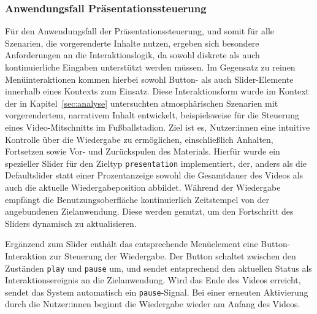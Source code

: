 \subsubsection{Anwendungsfall Präsentationssteuerung}
Für den Anwendungsfall der Präsentationssteuerung, und somit für alle Szenarien, die vorgerenderte Inhalte nutzen, ergeben sich besondere Anforderungen an die Interaktionslogik, da sowohl diskrete als auch kontinuierliche Eingaben unterstützt werden müssen.
Im Gegensatz zu reinen Menüinteraktionen kommen hierbei sowohl Button- als auch Slider-Elemente innerhalb eines Kontexts zum Einsatz.
Diese Interaktionsform wurde im Kontext der in Kapitel~\ref{sec:analyse} untersuchten atmosphärischen Szenarien mit vorgerendertem, narrativem Inhalt entwickelt, beispielsweise für die Steuerung eines Video-Mitschnitts im Fußballstadion. 
Ziel ist es, Nutzer:innen eine intuitive Kontrolle über die Wiedergabe zu ermög\-lichen, einschließlich Anhalten, Fortsetzen sowie Vor- und Zurückspulen des Materials.
Hierfür wurde ein spezieller Slider für den Zieltyp \texttt{presentation} implementiert, der, anders als die Defaultslider statt einer Prozentanzeige sowohl die Gesamtdauer des Videos als auch die aktuelle Wiedergabeposition abbildet. 
Während der Wiedergabe empfängt die Benutzungsoberfläche kontinuierlich Zeitstempel von der angebundenen Zielanwendung.
Diese werden genutzt, um den Fortschritt des Sliders dynamisch zu aktualisieren.

Ergänzend zum Slider enthält das entsprechende Menüelement eine Button-Interaktion zur Steuerung der Wiedergabe. 
Der Button schaltet zwischen den Zuständen \texttt{play} und \texttt{pause} um, und sendet entsprechend den aktuellen Status als Interaktionsereignis an die Zielanwendung.
Wird das Ende des Videos erreicht, sendet das System automatisch ein \texttt{pause}-Signal.
Bei einer erneuten Aktivierung durch die Nutzer:innen beginnt die Wiedergabe wieder am Anfang des Videos.


